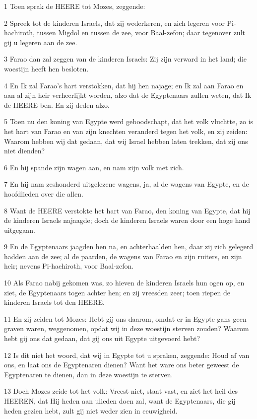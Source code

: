 \par 1 Toen sprak de HEERE tot Mozes, zeggende:
\par 2 Spreek tot de kinderen Israels, dat zij wederkeren, en zich legeren voor Pi-hachiroth, tussen Migdol en tussen de zee, voor Baal-zefon; daar tegenover zult gij u legeren aan de zee.
\par 3 Farao dan zal zeggen van de kinderen Israels: Zij zijn verward in het land; die woestijn heeft hen besloten.
\par 4 En Ik zal Farao's hart verstokken, dat hij hen najage; en Ik zal aan Farao en aan al zijn heir verheerlijkt worden, alzo dat de Egyptenaars zullen weten, dat Ik de HEERE ben. En zij deden alzo.
\par 5 Toen nu den koning van Egypte werd geboodschapt, dat het volk vluchtte, zo is het hart van Farao en van zijn knechten veranderd tegen het volk, en zij zeiden: Waarom hebben wij dat gedaan, dat wij Israel hebben laten trekken, dat zij ons niet dienden?
\par 6 En hij spande zijn wagen aan, en nam zijn volk met zich.
\par 7 En hij nam zeshonderd uitgelezene wagens, ja, al de wagens van Egypte, en de hoofdlieden over die allen.
\par 8 Want de HEERE verstokte het hart van Farao, den koning van Egypte, dat hij de kinderen Israels najaagde; doch de kinderen Israels waren door een hoge hand uitgegaan.
\par 9 En de Egyptenaars jaagden hen na, en achterhaalden hen, daar zij zich gelegerd hadden aan de zee; al de paarden, de wagens van Farao en zijn ruiters, en zijn heir; nevens Pi-hachiroth, voor Baal-zefon.
\par 10 Als Farao nabij gekomen was, zo hieven de kinderen Israels hun ogen op, en ziet, de Egyptenaars togen achter hen; en zij vreesden zeer; toen riepen de kinderen Israels tot den HEERE.
\par 11 En zij zeiden tot Mozes: Hebt gij ons daarom, omdat er in Egypte gans geen graven waren, weggenomen, opdat wij in deze woestijn sterven zouden? Waarom hebt gij ons dat gedaan, dat gij ons uit Egypte uitgevoerd hebt?
\par 12 Is dit niet het woord, dat wij in Egypte tot u spraken, zeggende: Houd af van ons, en laat ons de Egyptenaren dienen? Want het ware ons beter geweest de Egyptenaren te dienen, dan in deze woestijn te sterven.
\par 13 Doch Mozes zeide tot het volk: Vreest niet, staat vast, en ziet het heil des HEEREN, dat Hij heden aan ulieden doen zal, want de Egyptenaars, die gij heden gezien hebt, zult gij niet weder zien in eeuwigheid.
